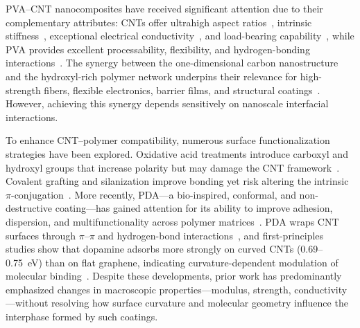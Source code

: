 \documentclass[journal=jacsat,manuscript=article]{achemso}
\begin{document}
PVA--CNT nanocomposites have received significant attention due to their complementary attributes: CNTs offer ultrahigh aspect ratios~\cite{falara2022recent}, intrinsic stiffness~\cite{sandhu2007career}, exceptional electrical conductivity~\cite{behabtu2013strong}, and load-bearing capability~\cite{zhou2020role}, while PVA provides excellent processability, flexibility, and hydrogen-bonding interactions~\cite{lekshmi2020recent}. The synergy between the one-dimensional carbon nanostructure and the hydroxyl-rich polymer network underpins their relevance for high-strength fibers, flexible electronics, barrier films, and structural coatings~\cite{yang2015fabrication, yim2025carbon, li2022cnt, liu2023modified}. However, achieving this synergy depends sensitively on nanoscale interfacial interactions.

To enhance CNT--polymer compatibility, numerous surface functionalization strategies have been explored. Oxidative acid treatments introduce carboxyl and hydroxyl groups that increase polarity but may damage the CNT framework~\cite{yang2011functionalization, siwal2020carbon}. Covalent grafting and silanization improve bonding yet risk altering the intrinsic $\pi$-conjugation~\cite{sabet2024innovative, suslova2019effect}. More recently, PDA---a bio-inspired, conformal, and non-destructive coating---has gained attention for its ability to improve adhesion, dispersion, and multifunctionality across polymer matrices~\cite{zeng2025artificial, sharma2025enhancing, wu2025two, jiang2025encapsulating, frenzel2025combined}. PDA wraps CNT surfaces through $\pi$--$\pi$ and hydrogen-bond interactions~\cite{cai2018polydopamine, demirci2021improved}, and first-principles studies show that dopamine adsorbs more strongly on curved CNTs (0.69--0.75~eV) than on flat graphene, indicating curvature-dependent modulation of molecular binding~\cite{kim2020adsorption}. Despite these developments, prior work has predominantly emphasized changes in macroscopic properties---modulus, strength, conductivity---without resolving how surface curvature and molecular geometry influence the interphase formed by such coatings.
\end{document}
